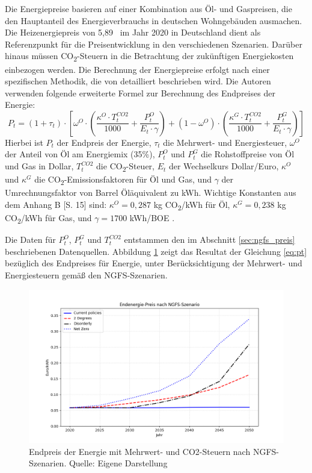 Die Energiepreise basieren auf einer Kombination aus Öl- und Gaspreisen, die den Hauptanteil des Energieverbrauchs in deutschen Wohngebäuden ausmachen. Die Heizenergiepreis von 5,89~ im Jahr 2020 in Deutschland \parencite{behr2023warmemonitor} dient als Referenzpunkt für die Preisentwicklung in den verschiedenen Szenarien. Darüber hinaus müssen CO\textsubscript{2}-Steuern in die Betrachtung der zukünftigen Energiekosten einbezogen werden. Die Berechnung der Energiepreise erfolgt nach einer spezifischen Methodik, die von \textcite{tergerman} detailliert beschrieben wird. Die Autoren verwenden folgende erweiterte Formel zur Berechnung des Endpreises der Energie:
\begin{equation}\label{eq:pt}
P_t = (1 + \tau_t) \cdot [\omega^O \cdot (\frac{\kappa^O \cdot T^{CO2}_t}{1000} + \frac{P^O_t}{E_t \cdot \gamma}) + (1 - \omega^O) \cdot (\frac{\kappa^G \cdot T^{CO2}_t}{1000} + \frac{P^G_t}{E_t \cdot \gamma})]
\end{equation}
Hierbei ist $P_t$ der Endpreis der Energie, $\tau_t$ die Mehrwert- und Energiesteuer, $\omega^O$ der Anteil von Öl am Energiemix (35\%), $P^O_t$ und $P^G_t$ die Rohstoffpreise von Öl und Gas in Dollar, $T^{CO2}_t$ die CO\textsubscript{2}-Steuer, $E_t$ der Wechselkurs Dollar/Euro, $\kappa^O$ und $\kappa^G$ die CO\textsubscript{2}-Emissionsfaktoren für Öl und Gas, und $\gamma$ der Umrechnungsfaktor von Barrel Öläquivalent zu kWh. Wichtige Konstanten aus dem Anhang B [S. 15] sind: $\kappa^O = 0,287$ kg CO\textsubscript{2}/kWh für Öl, $\kappa^G = 0,238$ kg CO\textsubscript{2}/kWh für Gas, und $\gamma = 1700$ kWh/BOE \parencite{tergerman}. 

Die Daten für $P^O_t$, $P^G_t$ und $T^{CO2}_t$ entstammen den im Abschnitt \ref{sec:ngfs_preis} beschriebenen Datenquellen.
Abbildung \ref{fig:endpreis_energie} zeigt das Resultat der Gleichung \ref{eq:pt} bezüglich des Endpreises für Energie, unter Berücksichtigung der Mehrwert- und Energiesteuern gemäß den NGFS-Szenarien.

\begin{figure}[htbp]
    \centering
    \includegraphics[width=\textwidth]{figures/endpreis.png}
    \caption{Endpreis der Energie mit Mehrwert- und CO2-Steuern nach NGFS-Szenarien. Quelle: Eigene Darstellung}
    \label{fig:endpreis_energie}
\end{figure}
\FloatBarrier